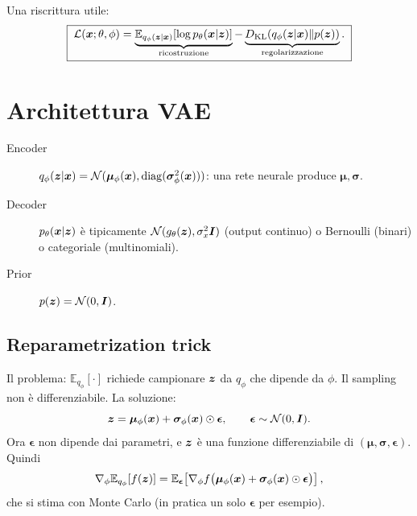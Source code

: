 Una riscrittura utile:
\begin{equation}\label{eq:elbo-vae}
\boxed{\;\mathcal{L}(\bm{x};\theta,\phi) = \underbrace{\mathbb{E}_{q_\phi(\bm{z}|\bm{x})}\!\left[\log p_\theta(\bm{x}|\bm{z})\right]}_{\text{ricostruzione}} - \underbrace{D_{\mathrm{KL}}\!\left(q_\phi(\bm{z}|\bm{x}) \| p(\bm{z})\right)}_{\text{regolarizzazione}}.\;}
\end{equation}

\section{Architettura VAE}

\begin{description}
  \item[Encoder] $q_\phi(\bm{z}|\bm{x}) = \mathcal{N}(\boldsymbol{\mu}_\phi(\bm{x}), \mathrm{diag}(\boldsymbol{\sigma}^2_\phi(\bm{x})))$: una rete neurale produce $\boldsymbol{\mu}, \boldsymbol{\sigma}$.
  \item[Decoder] $p_\theta(\bm{x}|\bm{z})$ è tipicamente $\mathcal{N}(g_\theta(\bm{z}), \sigma_x^2 \bm{I})$ (output continuo) o Bernoulli (binari) o categoriale (multinomiali).
  \item[Prior] $p(\bm{z}) = \mathcal{N}(0,\bm{I})$.
\end{description}

\subsection{Reparametrization trick}

Il problema: $\mathbb{E}_{q_\phi}[\cdot]$ richiede campionare $\bm{z}$ da $q_\phi$ che dipende da $\phi$. Il sampling non è differenziabile. La soluzione:
\begin{equation}
\bm{z} = \boldsymbol{\mu}_\phi(\bm{x}) + \boldsymbol{\sigma}_\phi(\bm{x}) \odot \boldsymbol{\epsilon}, \qquad \boldsymbol{\epsilon} \sim \mathcal{N}(0,\bm{I}).
\end{equation}
Ora $\boldsymbol{\epsilon}$ non dipende dai parametri, e $\bm{z}$ è una funzione differenziabile di $(\boldsymbol{\mu}, \boldsymbol{\sigma}, \boldsymbol{\epsilon})$. Quindi
\[
\nabla_\phi \mathbb{E}_{q_\phi}[f(\bm{z})] = \mathbb{E}_{\boldsymbol{\epsilon}}\!\left[\nabla_\phi f\big(\boldsymbol{\mu}_\phi(\bm{x}) + \boldsymbol{\sigma}_\phi(\bm{x}) \odot \boldsymbol{\epsilon}\big)\right],
\]
che si stima con Monte Carlo (in pratica un solo $\boldsymbol{\epsilon}$ per esempio).

